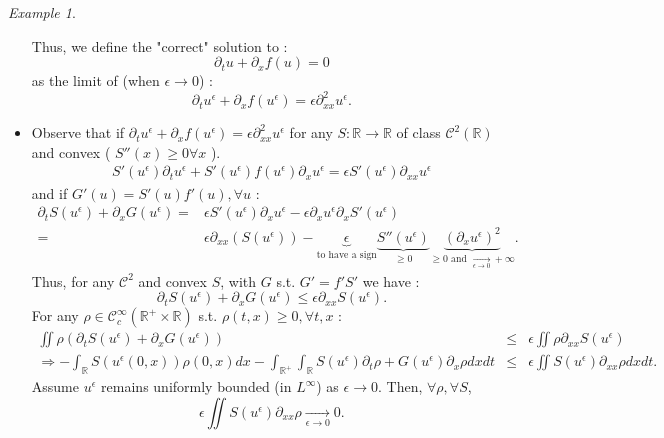 \documentclass{report}
\newcommand{\R}{\ensuremath{\mathbb{R}}} %
\theoremstyle{plain}
\theoremstyle{definition}
\theoremstyle{remark}
\newtheorem*{ex}{Example}
\begin{document}
\begin{ex}
\begin{itemize}
        Thus, we define the "correct" solution to : 
        $$\partial_t u + \partial_x f(u) = 0$$ as the limit of (when $\epsilon\rightarrow 0$) : $$\partial_t u^\epsilon + \partial_x f(u^\epsilon) = \epsilon \partial_{xx}^2 u^\epsilon.$$
        \item Observe that if $\partial_t u^\epsilon + \partial_x f(u^\epsilon) = \epsilon \partial_{xx}^2 u^\epsilon$ for any $S : \R \rightarrow \R$ of class $\mathcal{C}^2(\R)$ and convex ( $S''(x) \ge 0 \forall x$ ).
        \begin{eqnarray}
        S'(u^\epsilon)\partial_t u^\epsilon + S'(u^\epsilon) f(u^\epsilon)\partial_x u^\epsilon = \epsilon S'(u^\epsilon) \partial_{xx} u^\epsilon
        \end{eqnarray}
        and if $G'(u) = S'(u) f'(u), \forall u$ :
        \begin{eqnarray}
        \partial_t S(u^\epsilon) + \partial_x G(u^\epsilon)  =& \epsilon S'(u^\epsilon) \partial_{x} u^\epsilon - \epsilon \partial_x  u^\epsilon \partial_x S'(u^\epsilon)\\
        =& \epsilon\partial_{xx} (S(u^\epsilon)) - \underbrace{\epsilon}_{\text{to have a sign}} \underbrace{S''(u^\epsilon)}_{\ge 0} \underbrace{(\partial_x u^\epsilon)^2}_{\ge 0 \text{ and } \xrightarrow[\epsilon \rightarrow 0]{} +\infty}.
        \end{eqnarray}
        Thus, for any $\mathcal{C}^2$ and convex $S$, with $G$ s.t. $G' = f'S'$ we have :
        \begin{equation*}
            \partial_t S(u^\epsilon) + \partial_x G(u^\epsilon) \le \epsilon \partial_{xx} S(u^\epsilon).
        \end{equation*}
        For any $\rho \in \mathcal{C}^\infty_c(\R^+ \times \R)$ s.t. $\rho(t,x) \ge 0, \forall t,x$ :
        \begin{eqnarray*}
        \iint \rho(\partial_tS(u^\epsilon)+\partial_xG(u^\epsilon)) &\le& \epsilon \iint \rho \partial_{xx}S(u^\epsilon) \\
        \Rightarrow - \int_\R S(u^\epsilon(0,x))\rho(0,x)dx - \int_{\R^+}\int_\R S(u^\epsilon) \partial_t \rho + G(u^\epsilon)\partial_x\rho dx dt &\le& \epsilon \iint S(u^\epsilon)\partial_{xx}\rho dx dt.
        \end{eqnarray*}
        Assume $u^\epsilon$ remains uniformly bounded (in $L^\infty$) as $\epsilon \rightarrow 0$. Then, $\forall \rho, \forall S$, 
        \begin{equation*}
            \epsilon \iint S(u^\epsilon) \partial_{xx} \rho \xrightarrow[\epsilon \rightarrow 0]{} 0.

\end{equation*}
\end{itemize}
\end{ex}
\end{document}
